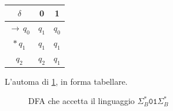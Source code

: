 \begin{margintable}
	\begin{center}
		\begin{tabular}{c|c|c}
			$\delta$   & 0     & 1     \\
			\hline
			$\to\,q_0$ & $q_1$ & $q_0$ \\
			\hline
			$*\,q_1$   & $q_1$ & $q_1$ \\
			\hline
			$q_2$      & $q_2$ & $q_1$
		\end{tabular}
	\end{center}
\caption{L'automa di \cref{fig:dfa-sottostringa-01}, in forma tabellare.}
\end{margintable}


\begin{figure}[ht!]

\caption{DFA che accetta il linguaggio $\Sigma_{B}^{*}\mathtt{01}\Sigma_{B}^{*}$}
\label{fig:dfa-sottostringa-01}\end{figure}




